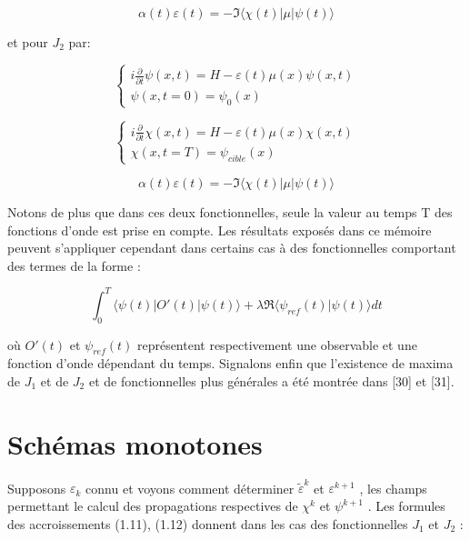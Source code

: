 \begin{equation}
\alpha(t)\varepsilon(t) = -\Im \langle \chi(t)|\mu|\psi(t)\rangle 
\end{equation}

et pour $J_2$ par:

\begin{equation}
\begin{cases}
i \frac{\partial}{\partial t} \psi (x,t) = H - \varepsilon(t)\mu(x)\psi(x,t)\\
\psi(x,t=0)=\psi_0(x)
\end{cases}
\end{equation}

\begin{equation}
\begin{cases}
i \frac{\partial}{\partial t} \chi (x,t) = H - \varepsilon(t)\mu(x)\chi(x,t)\\
\chi(x,t=T)=\psi_{cible}(x)
\end{cases}
\end{equation}

\begin{equation}
\alpha(t)\varepsilon(t) = -\Im \langle \chi(t)|\mu|\psi(t)\rangle 
\end{equation}

Notons de plus que dans ces deux fonctionnelles, seule la valeur au temps T des fonctions d’onde est prise en compte. Les résultats exposés dans ce mémoire peuvent s'appliquer cependant dans certains cas à des fonctionnelles comportant des termes de la forme :

\begin{equation}
\int_0^T \langle \psi(t)|O'(t)|\psi(t)\rangle + \lambda \Re\langle \psi_{ref}(t)|\psi(t)\rangle dt
\end{equation}

où $O'(t)$ et $\psi_{ref}(t)$ représentent respectivement une observable et une fonction d'onde dépendant du temps. Signalons enfin que l'existence de maxima de $J_1$ et de $J_2$ et de fonctionnelles plus générales a été montrée dans [30] et [31].

\section{Schémas monotones}
Supposons $\varepsilon_k$ connu et voyons comment déterminer $\tilde{\varepsilon}^k$ et $\varepsilon^{k+1}$ , les champs permettant le calcul des propagations respectives de $\chi^k$ et $\psi^{k+1}$ . Les formules des accroissements (1.11), (1.12) donnent dans les cas des fonctionnelles $J_1$ et $J_2$ :

